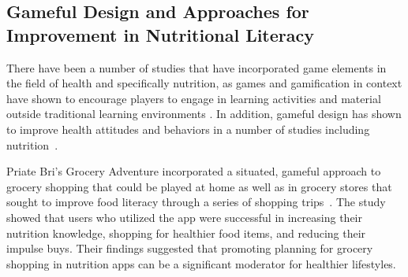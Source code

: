 


\subsection{Gameful Design and Approaches for Improvement in Nutritional Literacy}
There have been a number of studies that have incorporated game elements in the field of health and specifically nutrition, as games and  gamification in context have shown to encourage players to engage in learning activities and material outside traditional learning environments \cite{alessi1991computer, blumberg2014serious,chen2014healthifying,huizenga2009mobile,jui2011game,mueller2011designing,richards2014beyond}. In addition, gameful design has shown to improve health attitudes and behaviors in a number of studies including nutrition~\cite{deterding2011game,grimes2010let, johnson2016gamification,kyfonidis2019making,peng2009design,orji2013lunchtime,orji2017improving}.





Priate Bri's Grocery Adventure incorporated a situated, gameful approach to grocery shopping that could be played at home as well as in grocery stores that sought to improve food literacy through a series of shopping trips~\cite{bomfim2018pirate,bomfim2020food}. The study showed that users who utilized the app were successful in increasing their nutrition knowledge, shopping for healthier food items, and reducing their impulse buys. Their findings suggested that promoting planning for grocery shopping in nutrition apps can be a significant moderator for healthier lifestyles. 

